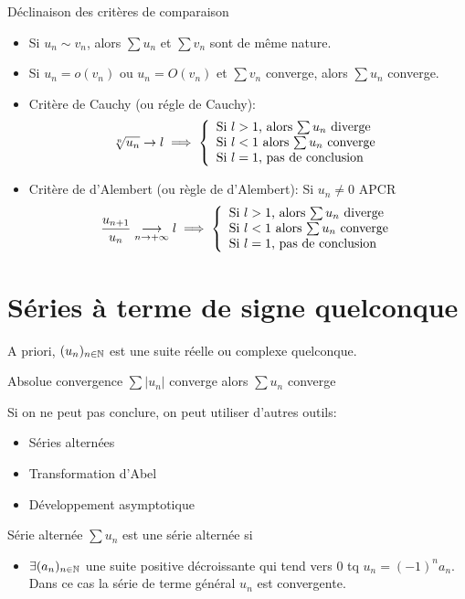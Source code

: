 \documentclass[]{report}
\begin{document}
\begin{cor}{Déclinaison des critères de comparaison}{}
    \begin{itemize}
        \item Si $u_n \sim v_n$, alors $\sum u_n$ et $\sum v_n$ sont de même nature.
        \item Si $u_n= o(v_n)$ ou $u_n=O(v_n)$ et $\sum v_n$ converge, alors $\sum u_n$ converge.
        \item Critère de Cauchy (ou régle de Cauchy):
              \[\sqrt[n]{u_n}\to l\implies \left\{\begin{array}{ll} \text{Si $l>1$, alors $\sum u_n$ diverge}\\ \text{Si $l<1$ alors $\sum u_n$ converge} \\ \text{Si $l=1$, pas de conclusion} \end{array} \right.\]
        \item Critère de d'Alembert (ou règle de d'Alembert): Si $u_n \neq 0$ APCR
              \[\frac{u_{n+1}}{u_n}\underset{n\to +\infty}{\longrightarrow} l\implies \left\{\begin{array}{ll} \text{Si $l>1$, alors $\sum u_n$ diverge}\\ \text{Si $l<1$ alors $\sum u_n$ converge} \\ \text{Si $l=1$, pas de conclusion} \end{array} \right.\]
    \end{itemize}
\end{cor}

\section{Séries à terme de signe quelconque}

A priori, $(u_n)_{n\in\mathbb{N}}$ est une suite réelle ou complexe quelconque.

\begin{prop}{Absolue convergence}{}
    $\sum |u_n|$ converge alors $\sum u_n $ converge
\end{prop}

Si on ne peut pas conclure, on peut utiliser d'autres outils:
\begin{itemize}
    \item Séries alternées
    \item Transformation d'Abel
    \item Développement asymptotique
\end{itemize}

\begin{dfprop}{Série alternée}{}
    $\sum u_n$ est une série alternée si
    \begin{itemize}
        \item $\exists (a_n)_{n\in\mathbb{N}}$ une suite positive décroissante qui tend vers $0$ tq $u_n=(-1)^n a_n$. Dans ce cas la série de terme général $u_n$ est convergente.
    \end{itemize}
\end{dfprop}
\end{document}
